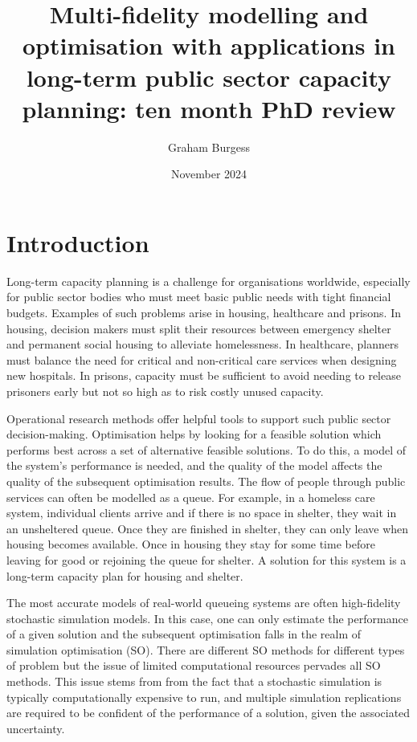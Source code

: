 \documentclass[12pt,a4paper]{article}
\title{Multi-fidelity modelling and optimisation with applications in long-term public sector capacity planning: ten month PhD review}
\author{Graham Burgess}
\date{November 2024}
\begin{document}
%
\maketitle
%
\section{Introduction}
%
Long-term capacity planning is a challenge for organisations worldwide, especially for public sector bodies who must meet basic public needs with tight financial budgets. Examples of such problems arise in housing, healthcare and prisons. In housing, decision makers must split their resources between emergency shelter and permanent social housing to alleviate homelessness. In healthcare, planners must balance the need for critical and non-critical care services when designing new hospitals. In prisons, capacity must be sufficient to avoid needing to release prisoners early but not so high as to risk costly unused capacity. 

Operational research methods offer helpful tools to support such public sector decision-making. Optimisation helps by looking for a feasible solution which performs best across a set of alternative feasible solutions. To do this, a model of the system's performance is needed, and the quality of the model affects the quality of the subsequent optimisation results. The flow of people through public services can often be modelled as a queue. For example, in a homeless care system, individual clients arrive and if there is no space in shelter, they wait in an unsheltered queue. Once they are finished in shelter, they can only leave when housing becomes available. Once in housing they stay for some time before leaving for good or rejoining the queue for shelter. A solution for this system is a long-term capacity plan for housing and shelter.

The most accurate models of real-world queueing systems are often high-fidelity stochastic simulation models. In this case, one can only estimate the performance of a given solution and the subsequent optimisation falls in the realm of simulation optimisation (SO). There are different SO methods for different types of problem but the issue of limited computational resources pervades all SO methods. This issue stems from from the fact that a stochastic simulation is typically computationally expensive to run, and multiple simulation replications are required to be confident of the performance of a solution, given the associated uncertainty.
\end{document}
